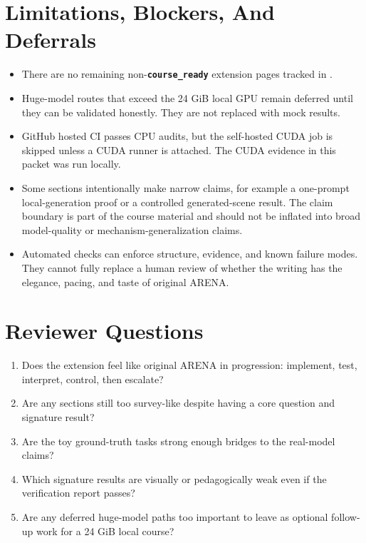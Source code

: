 \documentclass[11pt]{article}
\newcommand{\status}[1]{\textbf{\texttt{#1}}}
\begin{document}
\section{Limitations, Blockers, And Deferrals}
\begin{itemize}
  \item There are no remaining non-\status{course\_ready} extension pages tracked
  in .
  \item Huge-model routes that exceed the 24 GiB local GPU remain deferred until
  they can be validated honestly. They are not replaced with mock results.
  \item GitHub hosted CI passes CPU audits, but the self-hosted CUDA job is
  skipped unless a CUDA runner is attached. The CUDA evidence in this packet was
  run locally.
  \item Some sections intentionally make narrow claims, for example a
  one-prompt local-generation proof or a controlled generated-scene result. The
  claim boundary is part of the course material and should not be inflated into
  broad model-quality or mechanism-generalization claims.
  \item Automated checks can enforce structure, evidence, and known failure
  modes. They cannot fully replace a human review of whether the writing has the
  elegance, pacing, and taste of original ARENA.
\end{itemize}

\section{Reviewer Questions}
\begin{enumerate}
  \item Does the extension feel like original ARENA in progression: implement,
  test, interpret, control, then escalate?
  \item Are any sections still too survey-like despite having a core question and
  signature result?
  \item Are the toy ground-truth tasks strong enough bridges to the real-model
  claims?
  \item Which signature results are visually or pedagogically weak even if the
  verification report passes?
  \item Are any deferred huge-model paths too important to leave as optional
  follow-up work for a 24 GiB local course?
\end{enumerate}

\appendix
\end{document}
